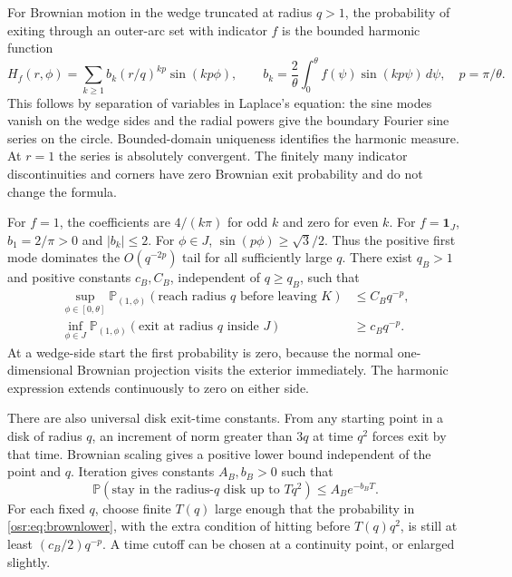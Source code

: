 \documentclass[11pt,letterpaper]{article}
\newcommand{\Prob}{\mathbb P}\newcommand{\E}{\mathbb E}
\newcommand{\one}{\mathbf 1}\newcommand{\ii}{\mathrm i}
\numberwithin{equation}{section}
\begin{document}
For Brownian motion in the wedge truncated at radius $q>1$, the probability of exiting through an outer-arc set with indicator $f$ is the bounded harmonic function
\begin{equation}\label{osr:eq:harmonic}
 H_f(r,\phi)=\sum_{k\ge1}b_k(r/q)^{kp}\sin(kp\phi),\qquad
 b_k=\frac2\theta\int_0^\theta f(\psi)\sin(kp\psi)\,d\psi,
 \quad p=\pi/\theta.
\end{equation}
This follows by separation of variables in Laplace's equation: the sine modes vanish on the wedge sides and the radial powers give the boundary Fourier sine series on the circle. Bounded-domain uniqueness identifies the harmonic measure. At $r=1$ the series is absolutely convergent. The finitely many indicator discontinuities and corners have zero Brownian exit probability and do not change the formula.

For $f=1$, the coefficients are $4/(k\pi)$ for odd $k$ and zero for even $k$. For $f=\one_J$, $b_1=2/\pi>0$ and $|b_k|\le2$. For $\phi\in J$, $\sin(p\phi)\ge\sqrt3/2$. Thus the positive first mode dominates the $O(q^{-2p})$ tail for all sufficiently large $q$. There exist $q_B>1$ and positive constants $c_B,C_B$, independent of $q\ge q_B$, such that
\begin{align}
 \sup_{\phi\in[0,\theta]}\Prob_{(1,\phi)}
   (\text{reach radius }q\text{ before leaving }K)&\le C_Bq^{-p},\label{osr:eq:brownupper}\\
 \inf_{\phi\in J}\Prob_{(1,\phi)}
   (\text{exit at radius }q\text{ inside }J)&\ge c_Bq^{-p}.\label{osr:eq:brownlower}
\end{align}
At a wedge-side start the first probability is zero, because the normal one-dimensional Brownian projection visits the exterior immediately. The harmonic expression extends continuously to zero on either side.

There are also universal disk exit-time constants. From any starting point in a disk of radius $q$, an increment of norm greater than $3q$ at time $q^2$ forces exit by that time. Brownian scaling gives a positive lower bound independent of the point and $q$. Iteration gives constants $A_B,b_B>0$ such that
\begin{equation}\label{osr:eq:browntail}
 \Prob(\text{stay in the radius-}q\text{ disk up to }Tq^2)
 \le A_Be^{-b_BT}.
\end{equation}
For each fixed $q$, choose finite $T(q)$ large enough that the probability in \eqref{osr:eq:brownlower}, with the extra condition of hitting before $T(q)q^2$, is still at least $(c_B/2)q^{-p}$. A time cutoff can be chosen at a continuity point, or enlarged slightly.
\end{document}
